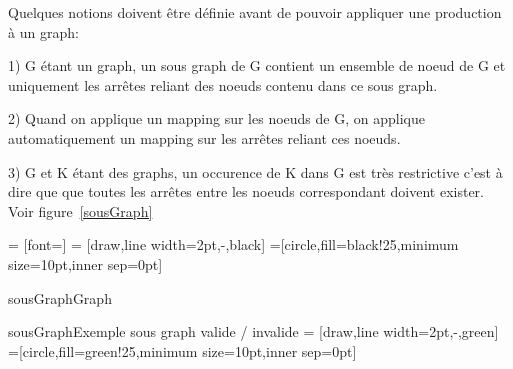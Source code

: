 \documentclass[a4paper, 12pt]{article}
\begin{document}
Quelques notions doivent être définie avant de pouvoir appliquer une production à un graph:

1) G étant un graph, un sous graph de G contient un ensemble de noeud de G et uniquement les arrêtes reliant des noeuds contenu dans ce sous graph. 

2) Quand on applique un mapping sur les noeuds de G, on applique automatiquement un mapping sur les arrêtes reliant ces noeuds.

3) G et K étant des graphs, un occurence de K dans G est très restrictive c'est à dire que que toutes les arrêtes entre les noeuds correspondant doivent exister. 
Voir figure~\ref{sousGraph} 

 = [font=\small]
 = [draw,line width=2pt,-,black]
=[circle,fill=black!25,minimum size=10pt,inner sep=0pt]
\begin{myfig}{sousGraph}{Graph}
\end{myfig}


\begin{myfig}{sousGraph}{Exemple sous graph valide / invalide}
 = [draw,line width=2pt,-,green]
=[circle,fill=green!25,minimum size=10pt,inner sep=0pt]
\end{myfig}
\end{document}
